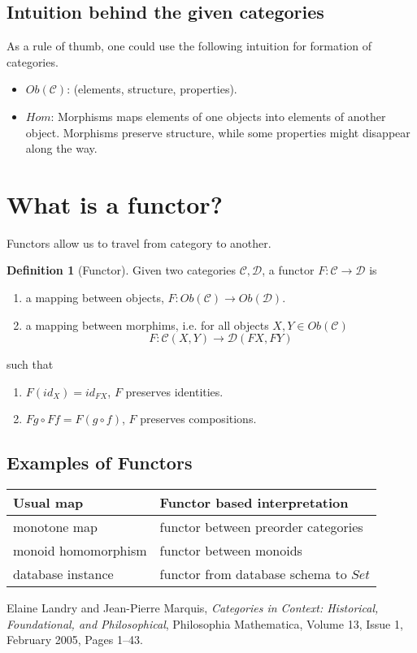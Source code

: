 \documentclass{report}
\theoremstyle{definition}
\newtheorem{definition}{Definition}
\begin{document}
\subsection*{Intuition behind the given categories}
As a rule of thumb, one could use the following intuition for formation of categories. 
\begin{itemize}
	\item $Ob(\mathcal{C})$: (elements, structure, properties). 
	\item $Hom$: Morphisms maps elements of one objects into elements of another object. Morphisms preserve structure, while some properties might disappear along the way. 
\end{itemize}

\section*{What is a functor?}
Functors allow us to travel from category to another. 
\begin{definition}[Functor]
	Given two categories $\mathcal{C}, \mathcal{D}$, a functor $F:\mathcal{C}\to\mathcal{D}$ is 
	\begin{enumerate}
		\item a mapping between objects, $F:Ob(\mathcal{C})\to Ob(\mathcal{D})$.
		\item a mapping between morphims, i.e. for all objects $X,Y\in Ob(\mathcal{C})$
		\[
		F: \mathcal{C}(X,Y) \to \mathcal{D}(FX,FY)
		\]
	\end{enumerate}	
	such that 
	\begin{enumerate}[label=(\alph*)]
		\item $F(id_X) = id_{FX}$, $F$ preserves identities.
		\item $Fg \circ Ff = F(g\circ f)$, $F$ preserves compositions.
	\end{enumerate}
\end{definition}

\subsection*{Examples of Functors}
\begin{center}
	\begin{tabular}{|l|l|}
		\hline
		Usual map & Functor based interpretation\\
		\hline
		monotone map & functor between preorder categories\\
		monoid homomorphism & functor between monoids\\
		database instance & functor from database schema to $Set$\\
		\hline
	\end{tabular}
\end{center}


\begin{thebibliography}{9}

Elaine Landry and Jean-Pierre Marquis,
\textit{Categories in Context: Historical, Foundational, and Philosophical},
Philosophia Mathematica, Volume 13, Issue 1, February 2005, Pages 1–43.
\end{thebibliography}
\end{document}
